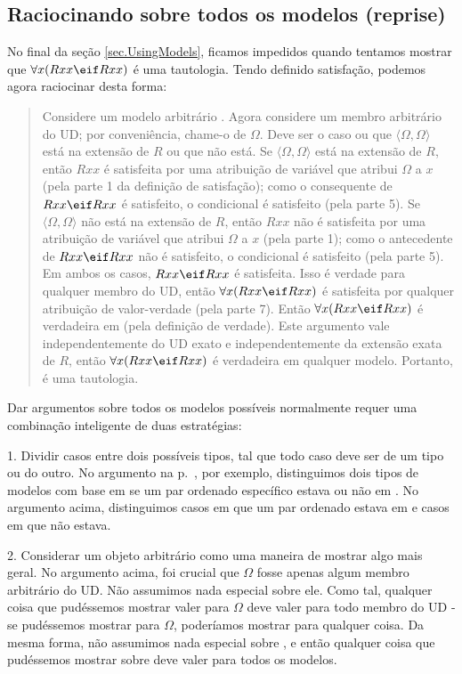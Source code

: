 \subsection{Raciocinando sobre todos os modelos (reprise)}
No final da seção \ref{sec.UsingModels}, ficamos impedidos quando tentamos mostrar que $\forall x(Rxx\eif Rxx)$ é uma tautologia. Tendo definido satisfação, podemos agora raciocinar desta forma:
\begin{quote}
Considere um modelo arbitrário . Agora considere um membro arbitrário do UD; por conveniência, chame-o de $\Omega$. Deve ser o caso ou que $\langle\Omega,\Omega\rangle$ está na extensão de $R$ ou que não está. Se $\langle\Omega,\Omega\rangle$ está na extensão de $R$, então $Rxx$ é satisfeita por uma atribuição de variável que atribui $\Omega$ a $x$ (pela parte 1 da definição de {satisfação}); como o consequente de $Rxx\eif Rxx$ é satisfeito, o condicional é satisfeito (pela parte 5). Se $\langle\Omega,\Omega\rangle$ não está na extensão de $R$, então $Rxx$ não é satisfeita por uma atribuição de variável que atribui $\Omega$ a $x$ (pela parte 1); como o antecedente de $Rxx\eif Rxx$ não é satisfeito, o condicional é satisfeito (pela parte 5). Em ambos os casos, $Rxx\eif Rxx$ é satisfeita. Isso é verdade para qualquer membro do UD, então $\forall x(Rxx \eif Rxx)$ é satisfeita por qualquer atribuição de valor-verdade (pela parte 7). Então $\forall x(Rxx \eif Rxx)$ é verdadeira em  (pela definição de {verdade}). Este argumento vale independentemente do UD exato e independentemente da extensão exata de $R$, então $\forall x(Rxx \eif Rxx)$ é verdadeira em qualquer modelo. Portanto, é uma tautologia.
\end{quote}

Dar argumentos sobre todos os modelos possíveis normalmente requer uma combinação inteligente de duas estratégias:

1. Dividir casos entre dois possíveis tipos, tal que todo caso deve ser de um tipo ou do outro. No argumento na p.~\pageref{allmodels1}, por exemplo, distinguimos dois tipos de modelos com base em se um par ordenado específico estava ou não em . No argumento acima, distinguimos casos em que um par ordenado estava em  e casos em que não estava.

2. Considerar um objeto arbitrário como uma maneira de mostrar algo mais geral. No argumento acima, foi crucial que $\Omega$ fosse apenas algum membro arbitrário do UD. Não assumimos nada especial sobre ele. Como tal, qualquer coisa que pudéssemos mostrar valer para $\Omega$ deve valer para todo membro do UD - se pudéssemos mostrar para $\Omega$, poderíamos mostrar para qualquer coisa. Da mesma forma, não assumimos nada especial sobre , e então qualquer coisa que pudéssemos mostrar sobre  deve valer para todos os modelos.

